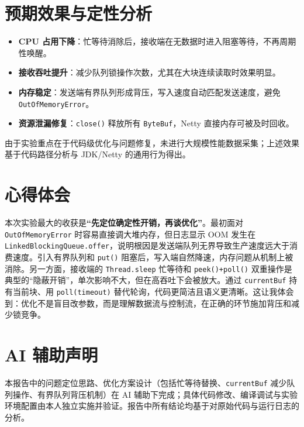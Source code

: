\documentclass[11pt,a4paper]{article}
\begin{document}
\section{预期效果与定性分析}
\begin{itemize}
    \item \textbf{CPU 占用下降}：忙等待消除后，接收端在无数据时进入阻塞等待，不再周期性唤醒。
    \item \textbf{接收吞吐提升}：减少队列锁操作次数，尤其在大块连续读取时效果明显。
    \item \textbf{内存稳定}：发送端有界队列形成背压，写入速度自动匹配发送速度，避免 \texttt{OutOfMemoryError}。
    \item \textbf{资源泄漏修复}：\texttt{close()} 释放所有 \texttt{ByteBuf}，Netty 直接内存可被及时回收。
\end{itemize}
由于实验重点在于代码级优化与问题修复，未进行大规模性能数据采集；上述效果基于代码路径分析与 JDK/Netty 的通用行为得出。

\section{心得体会}
本次实验最大的收获是\textbf{“先定位确定性开销，再谈优化”}。最初面对 \texttt{OutOfMemoryError} 时容易直接调大堆内存，但日志显示 OOM 发生在 \texttt{LinkedBlockingQueue.offer}，说明根因是发送端队列无界导致生产速度远大于消费速度。引入有界队列和 \texttt{put()} 阻塞后，写入端自然降速，内存问题从机制上被消除。另一方面，接收端的 \texttt{Thread.sleep} 忙等待和 \texttt{peek()+poll()} 双重操作是典型的“隐蔽开销”，单次影响不大，但在高吞吐下会被放大。通过 \texttt{currentBuf} 持有当前块、用 \texttt{poll(timeout)} 替代轮询，代码更简洁且语义更清晰。这让我体会到：优化不是盲目改参数，而是理解数据流与控制流，在正确的环节施加背压和减少锁竞争。

\section{AI 辅助声明}
本报告中的问题定位思路、优化方案设计（包括忙等待替换、\texttt{currentBuf} 减少队列操作、有界队列背压机制）在 AI 辅助下完成；具体代码修改、编译调试与实验环境配置由本人独立实施并验证。报告中所有结论均基于对原始代码与运行日志的分析。
\end{document}
